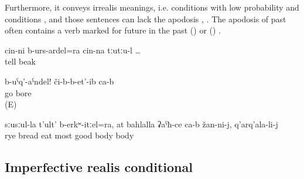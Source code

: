 Furthermore, it conveys irrealis  meanings, i.e. conditions with low probability and  conditions , and those sentences can lack the apodosis , . The apodosis of past  often contains a verb marked for future in the past () or  () .
%
\begin{exe}
	\ex	\label{ex:‎if he would have said it with his own mouth}
	\gll	cin-ni	b-urs-ardel=ra	cin-na	tːutːu-l	\ldots\\
			tell		beak\\
	\glt	{}

	\ex	\label{ex:‎‎‎If they would go! They bore (me)}
	\gll	b-uˁq'-aˁndel!	či-b-b-et'-ib	ca-b\\
		go	bore	\\
	\glt	{} (E)

	\ex	\label{ex:if (you) would eat bread made of rye, it is the best thing for you}
	\gll	sːusːul-la	t'ult'	b-erkʷ-itːel=ra,	at	bahlalla	ʡaˁħ-ce	ca-b	žan-ni-j,	q'arq'ala-li-j\\
		rye	bread	eat		most	good		body\tsc{-obl-dat}	body\\
	\glt	{}
\end{exe} 



\subsection{Imperfective realis conditional}
\label{sec:imperfectiverealisconditional}

